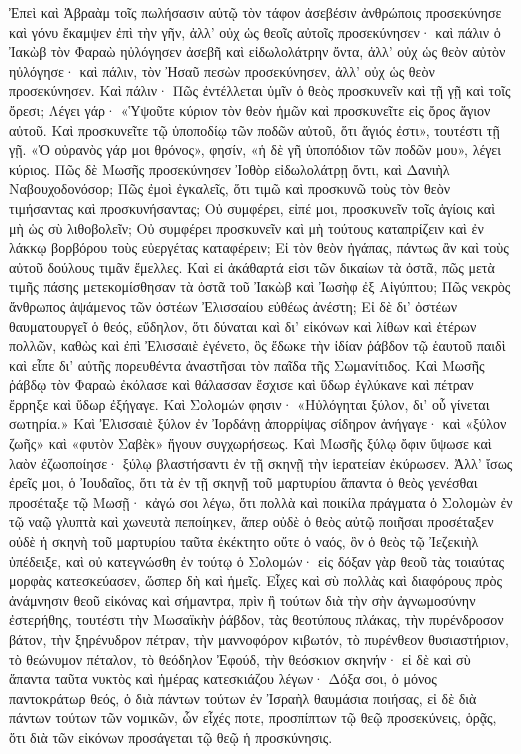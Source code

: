 \documentclass[10pt]{book}
\newcommand{\switchgreek}[1][]{\selectlanguage{polutonikogreek} \switchcolumn*[#1]}
\begin{document}
\begin{paracol}{2}
\switchgreek

Ἐπεὶ καὶ Ἀβραὰμ τοῖς πωλήσασιν αὐτῷ τὸν τάφον ἀσεβέσιν ἀνθρώποις προσεκύνησε
καὶ γόνυ ἔκαμψεν ἐπὶ τὴν γῆν, ἀλλ’ οὐχ ὡς θεοῖς αὐτοῖς προσεκύνησεν· καὶ πάλιν
ὁ Ἰακὼβ τὸν Φαραὼ ηὐλόγησεν ἀσεβῆ καὶ εἰδωλολάτρην ὄντα, ἀλλ’ οὐχ ὡς θεὸν
αὐτὸν ηὐλόγησε· καὶ πάλιν, τὸν Ἠσαῦ πεσὼν προσεκύνησεν, ἀλλ’ οὐχ ὡς θεὸν
προσεκύνησεν. Καὶ πάλιν· Πῶς ἐντέλλεται ὑμῖν ὁ θεὸς προσκυνεῖν καὶ τῇ γῇ καὶ
τοῖς ὄρεσι; Λέγει γάρ· «Ὑψοῦτε κύριον τὸν θεὸν ἡμῶν καὶ προσκυνεῖτε εἰς ὄρος
ἅγιον αὐτοῦ. Καὶ προσκυνεῖτε τῷ ὑποποδίῳ τῶν ποδῶν αὐτοῦ, ὅτι ἅγιός ἐστι»,
τουτέστι τῇ γῇ. «Ὁ οὐρανὸς γάρ μοι θρόνος», φησίν, «ἡ δὲ γῆ ὑποπόδιον τῶν
ποδῶν μου», λέγει κύριος. Πῶς δὲ Μωσῆς προσεκύνησεν Ἰοθὸρ εἰδωλολάτρῃ ὄντι,
καὶ Δανιὴλ Ναβουχοδονόσορ; Πῶς ἐμοὶ ἐγκαλεῖς, ὅτι τιμῶ καὶ προσκυνῶ τοὺς τὸν
θεὸν τιμήσαντας καὶ προσκυνήσαντας; Οὐ συμφέρει, εἰπέ μοι, προσκυνεῖν τοῖς
ἁγίοις καὶ μὴ ὡς σὺ λιθοβολεῖν; Οὐ συμφέρει προσκυνεῖν καὶ μὴ τούτους
καταπρίζειν καὶ ἐν λάκκῳ βορβόρου τοὺς εὐεργέτας καταφέρειν; Εἰ τὸν θεὸν
ἠγάπας, πάντως ἂν καὶ τοὺς αὐτοῦ δούλους τιμᾶν ἔμελλες. Καὶ εἰ ἀκάθαρτά εἰσι
τῶν δικαίων τὰ ὀστᾶ, πῶς μετὰ τιμῆς πάσης μετεκομίσθησαν τὰ ὀστᾶ τοῦ Ἰακὼβ καὶ
Ἰωσὴφ ἐξ Αἰγύπτου; Πῶς νεκρὸς ἄνθρωπος ἁψάμενος τῶν ὀστέων Ἐλισσαίου εὐθέως
ἀνέστη; Εἰ δὲ δι’ ὀστέων θαυματουργεῖ ὁ θεός, εὔδηλον, ὅτι δύναται καὶ δι’
εἰκόνων καὶ λίθων καὶ ἑτέρων πολλῶν, καθὼς καὶ ἐπὶ Ἐλισσαιὲ ἐγένετο, ὃς ἔδωκε
τὴν ἰδίαν ῥάβδον τῷ ἑαυτοῦ παιδὶ καὶ εἶπε δι’ αὐτῆς πορευθέντα ἀναστῆσαι τὸν
παῖδα τῆς Σωμανίτιδος. Καὶ Μωσῆς ῥάβδῳ τὸν Φαραὼ ἐκόλασε καὶ θάλασσαν ἔσχισε
καὶ ὕδωρ ἐγλύκανε καὶ πέτραν ἔρρηξε καὶ ὕδωρ ἐξήγαγε. Καὶ Σολομών φησιν·
«Ηὐλόγηται ξύλον, δι’ οὗ γίνεται σωτηρία.» Καὶ Ἐλισσαιὲ ξύλον ἐν Ἰορδάνῃ
ἀπορρίψας σίδηρον ἀνήγαγε· καὶ «ξύλον ζωῆς» καὶ «φυτὸν Σαβὲκ» ἤγουν
συγχωρήσεως. Καὶ Μωσῆς ξύλῳ ὄφιν ὕψωσε καὶ λαὸν ἐζωοποίησε· ξύλῳ βλαστήσαντι
ἐν τῇ σκηνῇ τὴν ἱερατείαν ἐκύρωσεν. Ἀλλ’ ἴσως ἐρεῖς μοι, ὁ Ἰουδαῖος, ὅτι τὰ ἐν
τῇ σκηνῇ τοῦ μαρτυρίου ἅπαντα ὁ θεὸς γενέσθαι προσέταξε τῷ Μωσῇ· κἀγώ σοι
λέγω, ὅτι πολλὰ καὶ ποικίλα πράγματα ὁ Σολομὼν ἐν τῷ ναῷ γλυπτὰ καὶ χωνευτὰ
πεποίηκεν, ἅπερ οὐδὲ ὁ θεὸς αὐτῷ ποιῆσαι προσέταξεν οὐδὲ ἡ σκηνὴ τοῦ μαρτυρίου
ταῦτα ἐκέκτητο οὔτε ὁ ναός, ὃν ὁ θεὸς τῷ Ἰεζεκιὴλ ὑπέδειξε, καὶ οὐ κατεγνώσθη
ἐν τούτῳ ὁ Σολομών· εἰς δόξαν γὰρ θεοῦ τὰς τοιαύτας μορφὰς κατεσκεύασεν, ὥσπερ
δὴ καὶ ἡμεῖς. Εἶχες καὶ σὺ πολλὰς καὶ διαφόρους πρὸς ἀνάμνησιν θεοῦ εἰκόνας
καὶ σήμαντρα, πρὶν ἢ τούτων διὰ τὴν σὴν ἀγνωμοσύνην ἐστερήθης, τουτέστι τὴν
Μωσαϊκὴν ῥάβδον, τὰς θεοτύπους πλάκας, τὴν πυρένδροσον βάτον, τὴν ξηρένυδρον
πέτραν, τὴν μαννοφόρον κιβωτόν, τὸ πυρένθεον θυσιαστήριον, τὸ θεώνυμον
πέταλον, τὸ θεόδηλον Ἐφούδ, τὴν θεόσκιον σκηνήν· εἰ δὲ καὶ σὺ ἅπαντα ταῦτα
νυκτὸς καὶ ἡμέρας κατεσκιάζου λέγων· Δόξα σοι, ὁ μόνος παντοκράτωρ θεός, ὁ διὰ
πάντων τούτων ἐν Ἰσραὴλ θαυμάσια ποιήσας, εἰ δὲ διὰ πάντων τούτων τῶν νομικῶν,
ὧν εἶχές ποτε, προσπίπτων τῷ θεῷ προσεκύνεις, ὁρᾷς, ὅτι διὰ τῶν εἰκόνων
προσάγεται τῷ θεῷ ἡ προσκύνησις.


\end{paracol}
\end{document}
